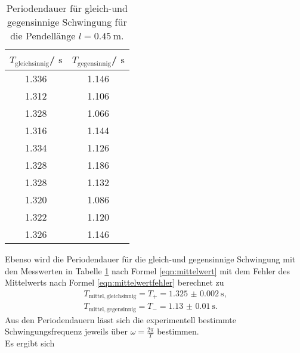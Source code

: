 \begin{table}
	\centering
	\caption{Periodendauer für gleich-und gegensinnige Schwingung für die Pendellänge $l=\SI{0.45}{\meter}$.}
	\label{tab:gleichgegen}
	\begin{tabular}{cc}
		\toprule
		$T_{\mathrm{gleichsinnig}}$/ $\si{\second}$ & $T_{\mathrm{gegensinnig}}$/ $\si{\second}$ \\
		\midrule
		1.336                                       & 1.146                                      \\
		1.312                                       & 1.106                                      \\
		1.328                                       & 1.066                                      \\
		1.316                                       & 1.144                                      \\
		1.334                                       & 1.126                                      \\
		1.328                                       & 1.186                                      \\
		1.328                                       & 1.132                                      \\
		1.320                                       & 1.086                                      \\
		1.322                                       & 1.120                                      \\
		1.326                                       & 1.146                                      \\
		\bottomrule
	\end{tabular}
\end{table}
Ebenso wird die Periodendauer für die gleich-und gegensinnige Schwingung mit den Messwerten in Tabelle \ref{tab:gleichgegen} nach Formel \eqref{eqn:mittelwert} mit dem Fehler des Mittelwerts nach Formel \eqref{eqn:mittelwertfehler} berechnet zu
\begin{gather*}
	T_{\mathrm{mittel, gleichsinnig}}=T_{\mathrm{+}}=\SI{1.325(2)}{\second} \text{,}\\
	T_{\mathrm{mittel, gegensinnig}}=T_{\mathrm{-}} =\SI{1.13(1)}{\second} \text{.}
\end{gather*}
Aus den Periodendauern lässt sich die experimentell bestimmte Schwingungsfrequenz jeweils über $\omega=\frac{2\pi}{T}$ bestimmen.
\\Es ergibt sich
